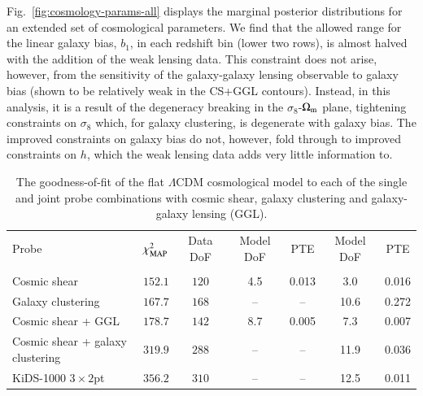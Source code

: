 Fig.~\ref{fig:cosmology-params-all} displays the marginal posterior distributions for an extended set of cosmological parameters.  
We find that the allowed range for the linear galaxy bias,  $b_1$, in each redshift bin (lower two rows), is almost halved with the addition of the weak lensing data. 
This constraint does not arise, however, from the sensitivity of the galaxy-galaxy lensing observable to galaxy bias (shown to be relatively weak in the CS+GGL contours). 
Instead, in this analysis, it is a result of the degeneracy breaking in the $\sigma_8$-$\Omega_{\rm m}$ plane, tightening constraints on $\sigma_8$ which, for galaxy clustering, is degenerate with galaxy bias. 
The improved constraints on galaxy bias do not, however, fold through to improved constraints on $h$, which the weak lensing data adds very little information to. 

\begin{table}
	\begin{center}
		\caption{The goodness-of-fit of the flat $\Lambda$CDM cosmological model to each of the single and joint probe combinations with cosmic shear, galaxy clustering and galaxy-galaxy lensing (GGL).}
		\label{tab:goodness-of-fit}
\begin{tabular}{lcccccc}
    \toprule
    Probe             & $\chi^2_{\rm MAP}$  & Data DoF  & Model DoF                   & PTE  & Model DoF          & PTE    \\
                      &                     &           &\citep{joachimi/etal:inprep} &      & \citep{Raveri2019} & \\
    \midrule
	Cosmic shear     & $152.1$ & $120$  &4.5 & 0.013 &3.0 & 0.016 \\
	Galaxy clustering & $167.7$ & $168$  &-- & -- &10.6 & 0.272 \\
	Cosmic shear + GGL & $178.7$ & $142$  &8.7 & 0.005 &7.3 & 0.007 \\
	Cosmic shear + galaxy clustering & $319.9$ & $288$  &-- & -- &11.9 & 0.036 \\
	KiDS-1000 $3\times2$pt & $356.2$ & $310$  &-- & -- &12.5 & 0.011 \\

    \bottomrule
\end{tabular}
	\end{center}
\end{table}



